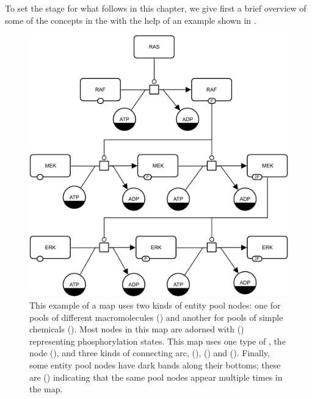 To set the stage for what follows in this chapter, we give first a brief overview of some of the concepts in the \PDl with the help of an example shown in .

\begin{figure}[H]
  \centering
  \includegraphics[scale=0.7]{images/build/MAPK_only_example.pdf}
  \caption{This example of a \PD map uses two kinds of entity pool nodes: one
    for pools of different macromolecules () and
    another for pools of simple chemicals ().  Most
     nodes in this map are adorned with  () representing phosphorylation states.
    This map uses one type of , the  node
    (), and three kinds of connecting arc,  (),  () and 
    ().  Finally, some entity pool nodes have dark bands
    along their bottoms; these are  () indicating that the same
    pool nodes appear multiple times in the map.}
  \label{fig:eg1}
\end{figure}


